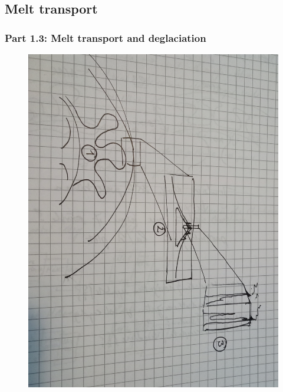 \documentclass[aspectratio=169]{beamer}
\begin{document}
\subsection{Melt transport}

\begin{frame}
    \frametitle{Part 1.3: Melt transport and deglaciation}
    \begin{figure}
        \includegraphics[height=0.8\paperheight, angle=90]{./pictures/temporary-drawing-2.jpg}
    \end{figure}
\end{frame}
\end{document}
